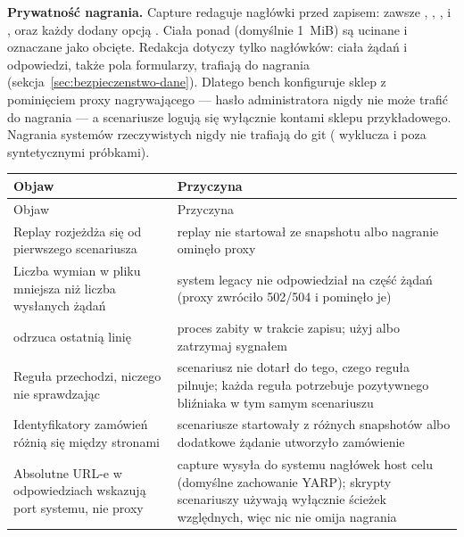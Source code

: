 \textbf{Prywatność nagrania.} Capture redaguje nagłówki przed zapisem: zawsze
, , ,
 i , oraz każdy dodany opcją
. Ciała ponad  (domyślnie 1~MiB) są
ucinane i oznaczane jako obcięte. Redakcja dotyczy tylko nagłówków: ciała żądań
i odpowiedzi, także pola formularzy, trafiają do nagrania
(sekcja~\ref{sec:bezpieczenstwo-dane}). Dlatego bench konfiguruje sklep z pominięciem proxy
nagrywającego --- hasło administratora nigdy nie może trafić do nagrania --- a scenariusze
logują się wyłącznie kontami sklepu przykładowego. Nagrania systemów rzeczywistych nigdy
nie trafiają do git ( wyklucza  i 
poza syntetycznymi próbkami).

\begin{xltabular}{\linewidth}{@{}>{\raggedright\arraybackslash}p{5.6cm} >{\raggedright\arraybackslash}X@{}}
\toprule
Objaw & Przyczyna \\
\midrule
\endfirsthead
\toprule
Objaw & Przyczyna \\
\midrule
\endhead
Replay rozjeżdża się od pierwszego scenariusza & replay nie startował ze snapshotu albo nagranie ominęło proxy \\
Liczba wymian w pliku mniejsza niż liczba wysłanych żądań & system legacy nie odpowiedział na część żądań (proxy zwróciło 502/504 i pominęło je) \\
 odrzuca ostatnią linię & proces zabity w trakcie zapisu; użyj  albo zatrzymaj sygnałem \\
Reguła  przechodzi, niczego nie sprawdzając & scenariusz nie dotarł do tego, czego reguła pilnuje; każda reguła  potrzebuje pozytywnego bliźniaka w tym samym scenariuszu \\
Identyfikatory zamówień różnią się między stronami & scenariusze startowały z różnych snapshotów albo dodatkowe żądanie utworzyło zamówienie \\
Absolutne URL-e w odpowiedziach wskazują port systemu, nie proxy & capture wysyła do systemu nagłówek host celu (domyślne zachowanie YARP); skrypty scenariuszy używają wyłącznie ścieżek względnych, więc nic nie omija nagrania \\
\bottomrule
\end{xltabular}

